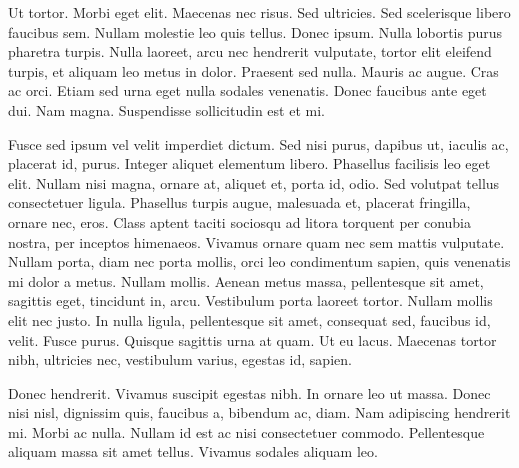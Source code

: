 Ut tortor. Morbi eget elit. Maecenas nec risus. Sed ultricies. Sed
scelerisque libero faucibus sem. Nullam molestie leo quis
tellus. Donec ipsum. Nulla lobortis purus pharetra turpis. Nulla
laoreet, arcu nec hendrerit vulputate, tortor elit eleifend turpis, et
aliquam leo metus in dolor. Praesent sed nulla. Mauris ac augue. Cras
ac orci. Etiam sed urna eget nulla sodales venenatis. Donec faucibus
ante eget dui. Nam magna. Suspendisse sollicitudin est et mi. 

Fusce sed ipsum vel velit imperdiet dictum. Sed nisi purus, dapibus
ut, iaculis ac, placerat id, purus. Integer aliquet elementum
libero. Phasellus facilisis leo eget elit. Nullam nisi magna, ornare
at, aliquet et, porta id, odio. Sed volutpat tellus consectetuer
ligula. Phasellus turpis augue, malesuada et, placerat fringilla,
ornare nec, eros. Class aptent taciti sociosqu ad litora torquent per
conubia nostra, per inceptos himenaeos. Vivamus ornare quam nec sem
mattis vulputate. Nullam porta, diam nec porta mollis, orci leo
condimentum sapien, quis venenatis mi dolor a metus. Nullam
mollis. Aenean metus massa, pellentesque sit amet, sagittis eget,
tincidunt in, arcu. Vestibulum porta laoreet tortor. Nullam mollis
elit nec justo. In nulla ligula, pellentesque sit amet, consequat sed,
faucibus id, velit. Fusce purus. Quisque sagittis urna at quam. Ut eu
lacus. Maecenas tortor nibh, ultricies nec, vestibulum varius, egestas
id, sapien. 

Donec hendrerit. Vivamus suscipit egestas nibh. In ornare leo ut
massa. Donec nisi nisl, dignissim quis, faucibus a, bibendum ac,
diam. Nam adipiscing hendrerit mi. Morbi ac nulla. Nullam id est ac
nisi consectetuer commodo. Pellentesque aliquam massa sit amet
tellus. Vivamus sodales aliquam leo. 
